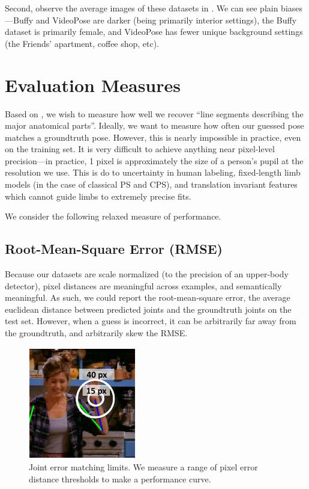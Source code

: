 Second, observe the average images of these datasets in 
.  We can see plain biases---Buffy and 
VideoPose are darker (being primarily interior settings), the Buffy dataset is 
primarily female, and VideoPose has fewer unique background settings (the 
Friends' apartment, coffee shop, etc).


\section{Evaluation Measures}

Based on , we wish to measure how well we recover ``line segments 
describing the major anatomical parts''.  Ideally, we want to measure how often 
our guessed pose matches a groundtruth pose.  However, this is nearly 
impossible in practice, even on the training set. It is very difficult to 
achieve anything near pixel-level precision---in practice, 1 pixel is 
approximately the size of a person's pupil at the resolution we use.  This is 
do to uncertainty in human labeling, fixed-length limb models (in the case of 
classical PS and CPS), and translation invariant features which cannot guide 
limbs to extremely precise fits.

We consider the following relaxed measure of performance.

\subsection{Root-Mean-Square Error (RMSE)}  Because our datasets are scale 
normalized (to the precision of an upper-body detector), pixel distances are 
meaningful across examples, and semantically meaningful.  As such, we could 
report the root-mean-square error, the average euclidean distance between 
predicted joints and the groundtruth joints on the test set.  However, when a 
guess is incorrect, it can be arbitrarily far away from the groundtruth, and 
arbitrarily skew the RMSE.  


\begin{figure}[t]
\begin{center}
\includegraphics[width=0.42\textwidth]{figs/pixel-err-demo}
\caption[Joint error matching limits.]{Joint error matching limits.  We measure 
a range of pixel error distance thresholds to make a performance curve.}
\label{fig:pixel-err-demo}
\end{center}
\end{figure}


